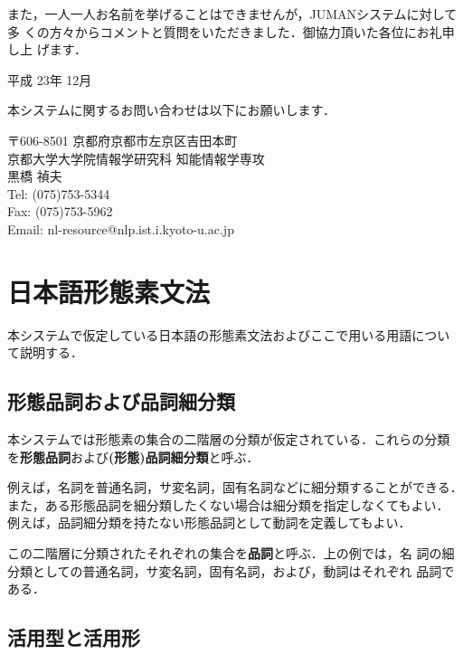 \documentclass[a4j,titlepage]{jarticle}
\begin{document}
また，一人一人お名前を挙げることはできませんが，JUMANシステムに対して多
くの方々からコメントと質問をいただきました．御協力頂いた各位にお礼申し上
げます．

\begin{flushright}
平成 23年 12月
\end{flushright}

\vfill

\noindent
本システムに関するお問い合わせは以下にお願いします．

\noindent
〒606-8501 京都府京都市左京区吉田本町 \\
京都大学大学院情報学研究科 知能情報学専攻 \\
黒橋 禎夫 \\
Tel: (075)753-5344 \\
Fax: (075)753-5962 \\
Email: {\sf nl-resource@nlp.ist.i.kyoto-u.ac.jp}

\clearpage

\section{日本語形態素文法}\label{s:jmg}

本システムで仮定している日本語の形態素文法およびここで用いる用語につい
て説明する．

\subsection{形態品詞および品詞細分類}
\label{ss:jmg-h}

本システムでは形態素の集合の二階層の分類が仮定されている．これらの分類
を{\bf 形態品詞}および{\bf (形態)品詞細分類}と呼ぶ．

例えば，名詞を普通名詞，サ変名詞，固有名詞などに細分類することができる．
また，ある形態品詞を細分類したくない場合は細分類を指定しなくてもよい．
例えば，品詞細分類を持たない形態品詞として動詞を定義してもよい．

この二階層に分類されたそれぞれの集合を{\bf 品詞}と呼ぶ．上の例では，名
詞の細分類としての普通名詞，サ変名詞，固有名詞，および，動詞はそれぞれ
品詞である．

\subsection{活用型と活用形}
\label{ss:jmg-k}
\end{document}
